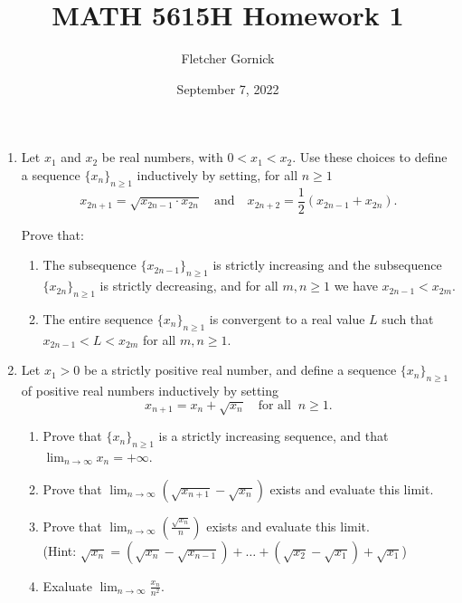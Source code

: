 \documentclass[11pt]{article}
\title{\vspace{-1.0cm}MATH 5615H Homework 1}
\author{Fletcher Gornick}
\date{September 7, 2022}
\begin{document}
\begin{enumerate}
  \item Let \(x_1\) and \(x_2\) be real numbers, with \(0 < x_1 < x_2\).  Use these choices to define a sequence 
    \(\{x_n\}_{n \geq 1}\) inductively by setting, for all \(n \geq 1\)
    \[x_{2n+1} = \sqrt{x_{2n-1} \cdot x_{2n}} \quad \text{and} \quad x_{2n+2} = \frac{1}{2} (x_{2n-1} + x_{2n}).\]

    Prove that:
    \begin{enumerate}[label=(\roman*)]
      \item The subsequence \(\{x_{2n-1}\}_{n \geq 1}\) is strictly increasing and the subsequence 
        \(\{x_{2n}\}_{n \geq 1}\) is strictly decreasing, and for all \(m, n \geq 1\) we have \(x_{2n-1} < x_{2m}\).

      \item The entire sequence \(\{x_n\}_{n \geq 1}\) is convergent to a real value \(L\) such that 
        \(x_{2n-1} < L < x_{2m}\) for all \(m, n \geq 1\).
    \end{enumerate}
    \newpage

  \item Let \(x_1 > 0\) be a strictly positive real number, and define a sequence \(\{x_n\}_{n \geq 1}\) of 
    positive real numbers inductively by setting 
    \[x_{n+1} = x_n + \sqrt{x_n} \quad \text{for all} \;\; n \geq 1.\]
    \begin{enumerate}[label=(\roman*)]
      \item Prove that \(\{x_n\}_{n \geq 1}\) is a strictly increasing sequence, and that 
        \(\displaystyle\lim_{n \to \infty} x_n = +\infty\).

      \item Prove that \(\displaystyle\lim_{n \to \infty} (\sqrt{x_{n+1}} - \sqrt{x_n})\) exists and evaluate 
        this limit.

      \item Prove that \(\displaystyle\lim_{n \to \infty} \left(\displaystyle\frac{\sqrt{x_n}}{n}\right)\) exists and 
        evaluate this limit. \\
        (Hint: \(\sqrt{x_n} = (\sqrt{x_n} - \sqrt{x_{n-1}}) + \dots + (\sqrt{x_2} - \sqrt{x_1}) + \sqrt{x_1}\))

      \item Exaluate \(\displaystyle\lim_{n \to \infty} \displaystyle\frac{x_n}{n^2}\).
    \end{enumerate}
    \newpage


\end{enumerate}
\end{document}
